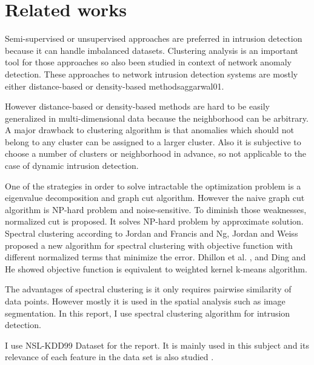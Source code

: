 \section{Related works}
Semi-supervised or unsupervised approaches are preferred in intrusion detection\cite{chandola09} because it can handle imbalanced datasets.
Clustering analysis is an important tool for those approaches so also been studied in context of network anomaly detection. 
These approaches to network intrusion detection systems are mostly either distance-based\cite{knorr00}\cite{ramaswamy00} or density-based methods\cite{breuning00}{aggarwal01}. 

However distance-based or density-based methods are hard to be easily generalized in multi-dimensional data because the neighborhood can be arbitrary. 
A major drawback to clustering algorithm is that anomalies which should not belong to any cluster can be assigned to a larger cluster. 
Also it is subjective to choose a number of clusters or neighborhood in advance, so not applicable to the case of dynamic intrusion detection. 

One of the strategies in order to solve intractable the optimization problem is a eigenvalue decomposition and graph cut algorithm. 
However the naive graph cut algorithm is NP-hard problem and noise-sensitive. 
To diminish those weaknesses, normalized cut\cite{jianbo00} is proposed. 
It solves NP-hard problem by approximate solution.
Spectral clustering according to Jordan and Francis \cite{jordan04} and Ng, Jordan and Weiss \cite{ng01} proposed a new algorithm for spectral clustering with objective function with different normalized terms that minimize the error.
Dhillon et al. \cite{dhillon04}, and Ding and He \cite{cding04} showed objective function is equivalent to weighted kernel k-means algorithm.

The advantages of spectral clustering is it only requires pairwise similarity of data points. 
However mostly it is used in the spatial analysis such as image segmentation. 
In this report, I use spectral clustering algorithm for intrusion detection. 

I use NSL-KDD99 Dataset for the report. 
It is mainly used in this subject\cite{tavallaee09} and its relevance of each feature in the data set is also studied\cite{olusola10} \cite{kayacik05}. 

